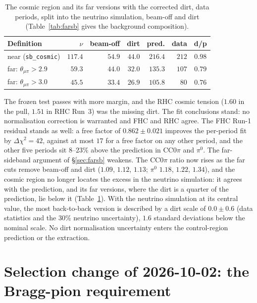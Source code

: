 \documentclass[11pt,a4paper]{article}
\begin{document}
\begin{table}[H]
  \centering
  \caption{The cosmic region and its far versions with the corrected dirt, data periods, split into the neutrino
    simulation, beam-off and dirt (Table~\ref{tab:farsb} gives the background composition).}
  \label{tab:farsb_cosmic}
  \small
  \begin{tabular}{lrrrrrc}
    \toprule
    Definition & $\nu$ & beam-off & dirt & pred. & data & d/p \\
    \midrule
    near (\texttt{sb\_cosmic})       & $117.4$ & $54.9$ & $44.0$ & $216.4$ & $212$ & $0.98$ \\
    far: $\theta_{\mu\pi}>2.9$       & $59.3$  & $44.0$ & $32.0$ & $135.3$ & $107$ & $0.79$ \\
    far: $\theta_{\mu\pi}>3.0$       & $45.5$  & $33.4$ & $26.9$ & $105.8$ & $80$  & $0.76$ \\
    \bottomrule
  \end{tabular}
\end{table}

The frozen test passes with more margin, and the RHC cosmic tension ($1.60$
in the pull, $1.51$ in RHC Run~3) was the missing dirt. The fit conclusions stand: no normalisation correction is
warranted and FHC and RHC agree. The FHC Run-1 residual stands as well: a free factor of $0.862\pm0.021$ improves the
per-period fit by $\Delta\chi^2=42$, against at most $17$ for a free factor on any other period, and the other five
periods sit $8$--$23\%$ above the prediction in CC$0\pi$ and $\pi^0$. The far-sideband argument of \S\ref{sec:farsb}
weakens. The CC$0\pi$ ratio now rises as the far cuts remove beam-off and dirt ($1.09$, $1.12$, $1.13$; $\pi^0$
$1.18$, $1.22$, $1.34$), and the cosmic region no longer locates the excess in the neutrino simulation: it agrees with
the prediction, and its far versions, where the dirt is a quarter of the prediction, lie below it
(Table~\ref{tab:farsb_cosmic}). With the neutrino simulation at its central value, the most back-to-back version is
described by a dirt scale of $0.0\pm0.6$ (data statistics and the $30\%$ neutrino uncertainty), $1.6$ standard
deviations below the nominal scale. No dirt normalisation uncertainty enters the control-region prediction or the
extraction.

\section{Selection change of 2026-10-02: the Bragg-pion requirement}
\label{sec:braggfix}
\end{document}
